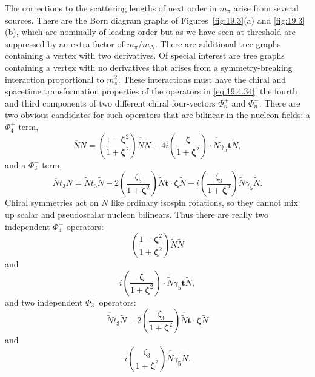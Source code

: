 The corrections to the scattering lengths of next order in $m_\pi$ arise from several sources. There are the Born diagram graphs of Figures~\ref{fig:19.3}(a) and \ref{fig:19.3}(b), which are nominally of leading order but as we have seen at threshold are suppressed by an extra factor of $m_\pi/m_N$. There are additional tree graphs containing a vertex with two derivatives. Of special interest are tree graphs containing a vertex with no derivatives that arises from a symmetry-breaking interaction proportional to $m_\pi^2$. These interactions must have the chiral and spacetime transformation properties of the operators in \eqref{eq:19.4.34}: the fourth and third components of two different chiral four-vectors $\Phi_n^+$ and $\Phi_n^-$. There are two obvious candidates for such operators that are bilinear in the nucleon fields: a $\Phi_4^+$ term,
\[
\overline NN
=\left(\frac{1-\boldsymbol{\zeta}^2}
{1+\boldsymbol{\zeta}^2}\right)
\overline{\widetilde N}\widetilde N
-4i\left(\frac{\boldsymbol{\zeta}}
{1+\boldsymbol{\zeta}^2}\right)
\cdot\overline{\widetilde N}\gamma_5\boldsymbol t\widetilde N,
\]
and a $\Phi_3^-$ term,
\[
\overline Nt_3N
=\overline{\widetilde N}t_3\widetilde N
-2\left(\frac{\zeta_3}{1+\boldsymbol{\zeta}^2}\right)
\overline{\widetilde N}\boldsymbol t\cdot
\boldsymbol{\zeta}\widetilde N
-i\left(\frac{\zeta_3}{1+\boldsymbol{\zeta}^2}\right)
\overline{\widetilde N}\gamma_5\widetilde N.
\]
Chiral symmetries act on $\widetilde N$ like ordinary isospin rotations, so they cannot mix up scalar and pseudoscalar nucleon bilinears. Thus there are really two independent $\Phi_4^+$ operators:
\begin{equation}
\left(\frac{1-\boldsymbol{\zeta}^2}
{1+\boldsymbol{\zeta}^2}\right)
\overline{\widetilde N}\widetilde N
\tag{19.5.61}\label{eq:19.5.61}
\end{equation}
and
\begin{equation}
i\left(\frac{\boldsymbol{\zeta}}
{1+\boldsymbol{\zeta}^2}\right)
\cdot\overline{\widetilde N}\gamma_5\boldsymbol t\widetilde N,
\tag{19.5.62}\label{eq:19.5.62}
\end{equation}
and two independent $\Phi_3^-$ operators:
\begin{equation}
\overline{\widetilde N}t_3\widetilde N
-2\left(\frac{\zeta_3}{1+\boldsymbol{\zeta}^2}\right)
\overline{\widetilde N}\boldsymbol t\cdot
\boldsymbol{\zeta}\widetilde N
\tag{19.5.63}\label{eq:19.5.63}
\end{equation}
and
\begin{equation}
i\left(\frac{\zeta_3}{1+\boldsymbol{\zeta}^2}\right)
\overline{\widetilde N}\gamma_5\widetilde N.
\tag{19.5.64}\label{eq:19.5.64}
\end{equation}
